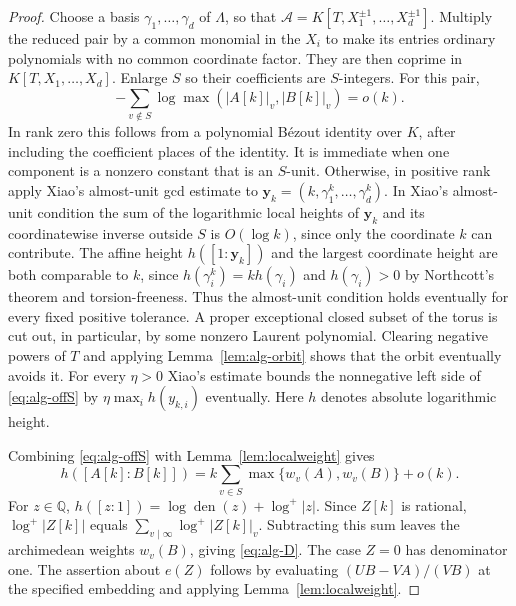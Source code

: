 \documentclass[11pt,a4paper,reqno]{amsart}
\theoremstyle{definition}
\theoremstyle{remark}
\numberwithin{equation}{section}
\begin{document}
\begin{proof}
Choose a basis \(\gamma_1,\ldots,\gamma_d\) of \(\Lambda\), so
that \(\mathcal A=K[T,X_1^{\pm1},\ldots,X_d^{\pm1}]\).
Multiply the reduced pair by a common monomial in the \(X_i\) to
make its entries ordinary polynomials with no common coordinate
factor. They are then coprime in \(K[T,X_1,\ldots,X_d]\).
Enlarge \(S\) so their coefficients are \(S\)-integers. For this
pair,
\begin{equation}\label{eq:alg-offS}
 -\sum_{v\notin S}\log\max(|A[k]|_v,|B[k]|_v)=o(k).
\end{equation}
In rank zero this follows from a polynomial B\'ezout identity
over \(K\), after including the coefficient places of the identity.
It is immediate when one component is a nonzero constant that is
an \(S\)-unit. Otherwise, in positive rank apply Xiao's
almost-unit gcd estimate \cite[preprint, Corollary~3.4 and the proof of
Theorem~4.2]{Xiao} to
\(\mathbf y_k=(k,\gamma_1^k,\ldots,\gamma_d^k)\). In Xiao's almost-unit condition the sum of the logarithmic
local heights of \(\mathbf y_k\) and its coordinatewise inverse
outside \(S\) is \(O(\log k)\), since only the coordinate \(k\)
can contribute. The affine height \(h([1:\mathbf y_k])\) and the
largest coordinate height are both comparable to \(k\), since
\(h(\gamma_i^k)=k h(\gamma_i)\) and \(h(\gamma_i)>0\) by
Northcott's theorem and torsion-freeness. Thus the almost-unit
condition holds eventually for every fixed positive tolerance. A proper exceptional closed subset of the torus is cut
out, in particular, by some nonzero Laurent polynomial. Clearing
negative powers of \(T\) and applying Lemma~\ref{lem:alg-orbit}
shows that the orbit eventually avoids it. For every \(\eta>0\)
Xiao's estimate bounds the nonnegative left side of
\eqref{eq:alg-offS} by \(\eta\max_i h(y_{k,i})\) eventually.
Here \(h\) denotes absolute logarithmic height.

Combining \eqref{eq:alg-offS} with Lemma~\ref{lem:localweight}
gives
\[
 h([A[k]:B[k]])=
 k\sum_{v\in S}\max\{w_v(A),w_v(B)\}+o(k).
\]
For \(z\in\mathbb Q\),
\(h([z:1])=\log\operatorname{den}(z)+\log^+|z|\).
Since \(Z[k]\) is rational, \(\log^+|Z[k]|\) equals
\(\sum_{v\mid\infty}\log^+|Z[k]|_v\). Subtracting this sum leaves
the archimedean weights \(w_v(B)\), giving \eqref{eq:alg-D}.
The case \(Z=0\) has denominator one. The assertion about \(e(Z)\)
follows by evaluating \((UB-VA)/(VB)\) at the specified embedding
and applying Lemma~\ref{lem:localweight}.
\end{proof}
\end{document}
